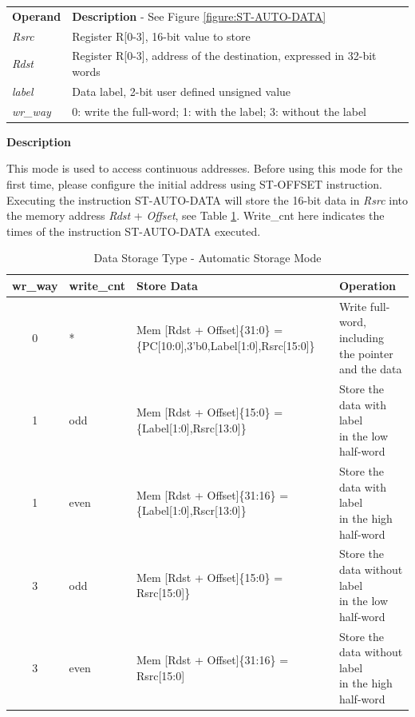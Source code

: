 \documentclass[main\_\_EN.tex]{subfiles}
\begin{document}
\begin{tabular}{ l l }
\textbf{Operand} & \textbf{Description} - See Figure \ref{figure:ST-AUTO-DATA} \\
\textit{Rsrc} & Register R[0-3], 16-bit value to store\\
\textit{Rdst} & Register R[0-3], address of the destination, expressed in 32-bit words \\
\textit{label} & Data label, 2-bit user defined unsigned value\\
\textit{wr\_way} & 0: write the full-word; 1: with the label; 3: without the label
\end{tabular}

\textbf{Description}

This mode is used to access continuous addresses. Before using this mode for the first time, please configure the initial address using ST-OFFSET instruction. Executing the instruction ST-AUTO-DATA will store the 16-bit data in \textit{Rsrc} into the memory address \textit{Rdst} + \textit{Offset}, see Table \ref{table:data_format-with-write_way-auto}. Write\_cnt here indicates the times of the instruction ST-AUTO-DATA executed.

\clearpage
\begin{table}[!ht ]
    \centering
    \begin{tabular}{ c l l l }
    \textbf{wr\_way}  & \textbf{write\_cnt} & \textbf{Store Data} & \textbf{Operation}  \\ \hline
    0 &*&Mem [Rdst + Offset]\{31:0\} = \{PC[10:0],3'b0,Label[1:0],Rsrc[15:0]\}  & \makecell[tl]{Write full-word, including  \\ the pointer and the data} \\
    1 & odd & Mem [Rdst + Offset]\{15:0\}  = \{Label[1:0],Rsrc[13:0]\} &  \makecell[tl]{Store the data with label  \\ in the low half-word} \\
    1 & even & Mem [Rdst + Offset]\{31:16\} = \{Label[1:0],Rscr[13:0]\} & \makecell[tl]{Store the data with label \\ in the high half-word}\\
    3 & odd & Mem [Rdst + Offset]\{15:0\}  = Rsrc[15:0]\}& \makecell[tl]{Store the data without label  \\ in the low half-word}  \\
    3 & even & Mem [Rdst + Offset]\{31:16\} = Rsrc[15:0] & \makecell[tl]{Store the data without label  \\ in the high half-word}   \\
    \end{tabular}
    \caption{Data Storage Type - Automatic Storage Mode}
    \label{table:data_format-with-write_way-auto}
\end{table}
\end{document}
